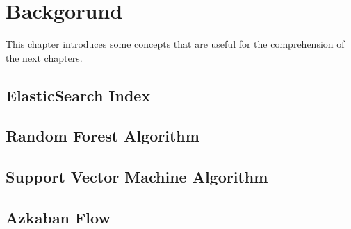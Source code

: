 \chapter{Backgorund} 
This chapter introduces some concepts that are useful for the comprehension of the next chapters.

\section{ElasticSearch Index}
\section{Random Forest Algorithm}
\section{Support Vector Machine Algorithm}
\section{Azkaban Flow}